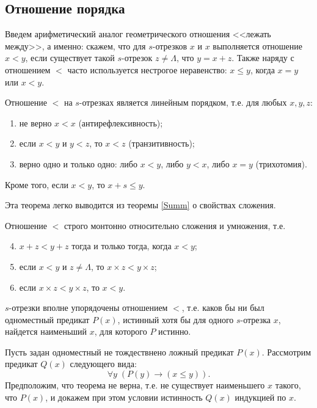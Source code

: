\subsection{Отношение порядка}

Введем арифметический аналог геометрического отношения <<лежать между>>, а именно: скажем, что для $s$-отрезков $x$ и $x$ выполняется отношение $x<y$, если существует такой $s$-отрезок $z\ne\Lambda$, что $y=x+z$. Также наряду с отношением $<$ часто используется нестрогое неравенство: $x\le y$, когда $x=y$ или $x<y$.

\begin{thrm}\label{Ord1}
Отношение $<$ на $s$-отрезках является линейным порядком, т.е. для любых $x,y,z$:
\begin{enumerate}[O1]
\item не верно $x<x$ (антирефлексивность);
\item если $x<y$ и $y<z$, то $x<z$ (транзитивность);
\item верно одно и только одно: либо $x<y$, либо $y<x$, либо $x=y$ (трихотомия).
\end{enumerate}
Кроме того, если $x<y$, то $x+s\le y$.
\end{thrm}
Эта теорема легко выводится из теоремы \ref{Summ} о свойствах сложения.

\begin{thrm}[Монотонность]\label{Ord2}
Отношение $<$ строго монтонно относительно сложения и умножения, т.е.
\begin{enumerate}[O1]\setcounter{enumi}{3}
\item $x+z<y+z$ тогда и только тогда, когда $x<y$;
\item если $x<y$ и $z\ne\Lambda$, то $x\times z<y\times z$;
\item если $x\times z<y\times z$, то $x<y$.
\end{enumerate}
\end{thrm}

\begin{thrm}\label{Ord3}
$s$-отрезки вполне упорядочены отношением $<$, т.е. каков бы ни был одноместный предикат $P(x)$, истинный хотя бы для одного $s$-отрезка $x$, найдется наименьший $x$, для которого $P$ истинно.
\end{thrm}
\pf
Пусть задан одноместный не тождествнено ложный предикат $P(x)$. Рассмотрим предикат $Q(x)$ следующего вида:
$$
\forall y\;(P(y)\to (x\le y)).
$$
Предположим, что теорема не верна, т.е. не существует наименьшего $x$ такого, что $P(x)$, и докажем при этом условии истинность $Q(x)$ индукцией по $x$.

